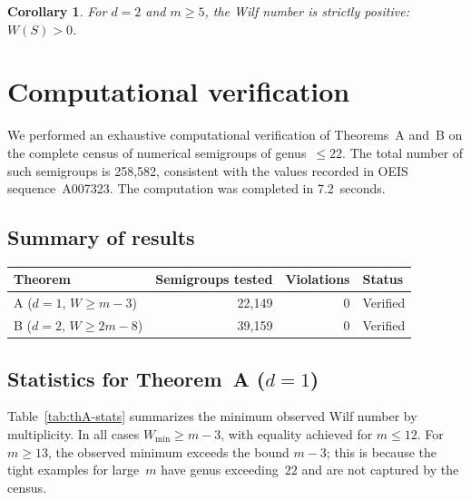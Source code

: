 \documentclass[11pt]{amsart}
\newtheorem{corollary}[theorem]{Corollary}
\theoremstyle{definition}
\theoremstyle{remark}
\begin{document}
\begin{corollary}\label{cor:positive-d2}
For $d = 2$ and $m \ge 5$, the Wilf number is strictly positive: $W(S) > 0$.
\end{corollary}

\section{Computational verification}\label{sec:computation}

We performed an exhaustive computational verification of Theorems~A and~B
on the complete census of numerical semigroups of genus~$\le 22$.
The total number of such semigroups is 258{,}582, consistent with the
values recorded in OEIS sequence~A007323.
The computation was completed in 7.2~seconds.

\subsection{Summary of results}

\begin{center}
\begin{tabular}{lrrl}
\toprule
\textbf{Theorem} & \textbf{Semigroups tested} & \textbf{Violations} & \textbf{Status} \\
\midrule
A ($d = 1$, $W \ge m - 3$)  & 22{,}149 & 0 & Verified \\
B ($d = 2$, $W \ge 2m - 8$) & 39{,}159 & 0 & Verified \\
\bottomrule
\end{tabular}
\end{center}

\subsection{Statistics for Theorem~A ($d=1$)}

Table~\ref{tab:thA-stats} summarizes the minimum observed Wilf number
by multiplicity.  In all cases $W_{\min} \ge m - 3$, with equality achieved
for $m \le 12$.  For $m \ge 13$, the observed minimum exceeds the bound
$m - 3$; this is because the tight examples for large~$m$ have genus
exceeding~$22$ and are not captured by the census.
\end{document}
